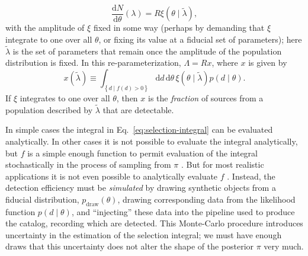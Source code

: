 \documentclass[modern]{aastex62}
\newcommand{\dd}{\mathrm{d}}
\newcommand{\diff}[2]{\frac{\dd #1}{\dd #2}}
\newcommand{\pdraw}{p_\mathrm{draw}}
\begin{document}
\begin{equation}
  \diff{N}{\theta}\left( \lambda \right) = R \xi\left( \theta \mid \tilde{\lambda} \right),
\end{equation}
%
with the amplitude of $\xi$ fixed in some way (perhaps by demanding that $\xi$
integrate to one over all $\theta$, or fixing its value at a fiducial set of
parameters); here $\tilde{\lambda}$ is the set of parameters that remain once
the amplitude of the population distribution is fixed.  In this
re-parameterization, $\Lambda = R x$, where $x$ is given by
%
\begin{equation}
  \label{eq:selection-integral}
  x\left( \tilde{\lambda} \right) \equiv \int_{\left\{ d \mid f(d) > 0 \right\}} \dd d \, \dd \theta \, \xi\left( \theta \mid \tilde{\lambda} \right) p\left( d \mid \theta \right).
\end{equation}
%
If $\xi$ integrates to one over all $\theta$, then $x$ is the \emph{fraction} of
sources from a population described by $\tilde{\lambda}$ that are detectable.

In simple cases the integral in Eq.\ \eqref{eq:selection-integral} can be
evaluated analytically.  In other cases it is not possible to evaluate the
integral analytically, but $f$ is a simple enough function to permit evaluation
of the integral stochastically in the process of sampling from $\pi$
\citep{Mandel2018}.  But for most realistic applications it is not even possible
to analytically evaluate $f$ \citep[see
e.g.][]{Burke2015,Christainsen2015,GW150914-Rate,GW150914-Rate-Supplement,Burke2017}.
Instead, the detection efficiency must be \emph{simulated} by drawing synthetic
objects from a fiducial distribution, $\pdraw\left( \theta \right)$, drawing
corresponding data from the likelihood function $p\left( d \mid \theta \right)$,
and ``injecting'' these data into the pipeline used to produce the catalog,
recording which are detected.  This Monte-Carlo procedure introduces uncertainty
in the estimation of the selection integral; we must have enough draws that this
uncertainty does not alter the shape of the posterior $\pi$ very much.
\end{document}
